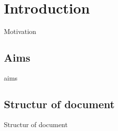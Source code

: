 \chapter{Introduction}
Motivation

\section{Aims}
aims

\section{Structur of document}
Structur of document
